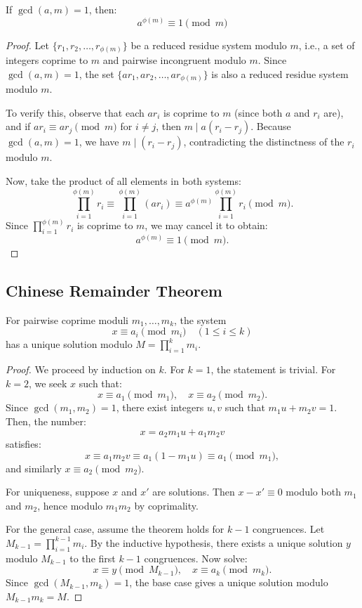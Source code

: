 \documentclass{scrartcl} %
\begin{document}
\begin{theorem}\label{thm:eulerstheorem}
If $\gcd(a,m) = 1$, then:
\[ a^{\phi(m)} \equiv 1 \pmod{m} \]
\end{theorem}

\begin{proof}
Let $\{r_1, r_2, \ldots, r_{\phi(m)}\}$ be a reduced residue system modulo $m$, i.e., a set of integers coprime to $m$ and pairwise incongruent modulo $m$. Since $\gcd(a, m) = 1$, the set $\{a r_1, a r_2, \ldots, a r_{\phi(m)}\}$ is also a reduced residue system modulo $m$. 

To verify this, observe that each $a r_i$ is coprime to $m$ (since both $a$ and $r_i$ are), and if $a r_i \equiv a r_j \pmod{m}$ for $i \neq j$, then $m \mid a(r_i - r_j)$. Because $\gcd(a, m) = 1$, we have $m \mid (r_i - r_j)$, contradicting the distinctness of the $r_i$ modulo $m$.

Now, take the product of all elements in both systems:
\[
\prod_{i=1}^{\phi(m)} r_i \equiv \prod_{i=1}^{\phi(m)} (a r_i) \equiv a^{\phi(m)} \prod_{i=1}^{\phi(m)} r_i \pmod{m}.
\]
Since $\prod_{i=1}^{\phi(m)} r_i$ is coprime to $m$, we may cancel it to obtain:
\[
a^{\phi(m)} \equiv 1 \pmod{m}.
\]
\end{proof}

\subsection{Chinese Remainder Theorem}

\begin{theorem}\label{thm:chineseremaindertheorem}
For pairwise coprime moduli $m_1,\ldots,m_k$, the system
\[ x \equiv a_i \pmod{m_i} \quad (1 \leq i \leq k) \]
has a unique solution modulo $M = \prod_{i=1}^k m_i$.
\end{theorem}

\begin{proof}
We proceed by induction on $k$. For $k = 1$, the statement is trivial. For $k = 2$, we seek $x$ such that:
\[
x \equiv a_1 \pmod{m_1}, \quad x \equiv a_2 \pmod{m_2}.
\]
Since $\gcd(m_1, m_2) = 1$, there exist integers $u, v$ such that $m_1 u + m_2 v = 1$. Then, the number:
\[
x = a_2 m_1 u + a_1 m_2 v
\]
satisfies:
\[
x \equiv a_1 m_2 v \equiv a_1 (1 - m_1 u) \equiv a_1 \pmod{m_1},
\]
and similarly $x \equiv a_2 \pmod{m_2}$. 

For uniqueness, suppose $x$ and $x'$ are solutions. Then $x - x' \equiv 0$ modulo both $m_1$ and $m_2$, hence modulo $m_1 m_2$ by coprimality.

For the general case, assume the theorem holds for $k-1$ congruences. Let $M_{k-1} = \prod_{i=1}^{k-1} m_i$. By the inductive hypothesis, there exists a unique solution $y$ modulo $M_{k-1}$ to the first $k-1$ congruences. Now solve:
\[
x \equiv y \pmod{M_{k-1}}, \quad x \equiv a_k \pmod{m_k}.
\]
Since $\gcd(M_{k-1}, m_k) = 1$, the base case gives a unique solution modulo $M_{k-1} m_k = M$.
\end{proof}
\end{document}
